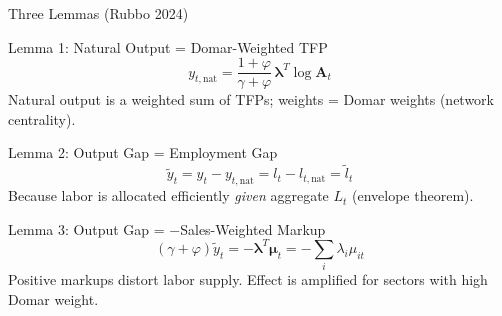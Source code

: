 \documentclass[aspectratio=169]{beamer}
\begin{document}
\begin{frame}{Three Lemmas (Rubbo 2024)}

\begin{block}{Lemma 1: Natural Output = Domar-Weighted TFP}
\begin{equation*}
    y_{t,\mathrm{nat}} = \frac{1+\varphi}{\gamma+\varphi}\,\bm{\lambda}^T \log\mathbf{A}_t
\end{equation*}
Natural output is a weighted sum of TFPs; weights = Domar weights (network centrality).
\end{block}

\begin{block}{Lemma 2: Output Gap = Employment Gap}
\begin{equation*}
    \tilde{y}_t = y_t - y_{t,\mathrm{nat}} = l_t - l_{t,\mathrm{nat}} = \tilde{l}_t
\end{equation*}
Because labor is allocated efficiently \textit{given} aggregate $L_t$ (envelope theorem).
\end{block}

\begin{block}{Lemma 3: Output Gap = $-$Sales-Weighted Markup}
\begin{equation*}
    (\gamma+\varphi)\tilde{y}_t = -\bm{\lambda}^T\bm{\mu}_t = -\sum_i \lambda_i \mu_{it}
\end{equation*}
Positive markups distort labor supply. Effect is amplified for sectors with high Domar weight.
\end{block}
\end{frame}
\end{document}
